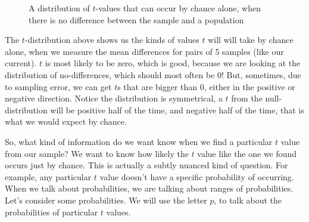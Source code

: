 \documentclass[
  letterpaper,
  DIV=11,
  numbers=noendperiod]{scrreprt}
\begin{document}
\begin{figure}


\caption{\label{fig-7tnull}A distribution of \(t\)-values that can occur
by chance alone, when there is no difference between the sample and a
population}

\end{figure}%

The \(t\)-distribution above shows us the kinds of values \(t\) will
will take by chance alone, when we measure the mean differences for
pairs of 5 samples (like our current). \(t\) is most likely to be zero,
which is good, because we are looking at the distribution of
no-differences, which should most often be 0! But, sometimes, due to
sampling error, we can get \(t\)s that are bigger than 0, either in the
positive or negative direction. Notice the distribution is symmetrical,
a \(t\) from the null-distribution will be positive half of the time,
and negative half of the time, that is what we would expect by chance.

So, what kind of information do we want know when we find a particular
\(t\) value from our sample? We want to know how likely the \(t\) value
like the one we found occurs just by chance. This is actually a subtly
nuanced kind of question. For example, any particular \(t\) value
doesn't have a specific probability of occurring. When we talk about
probabilities, we are talking about ranges of probabilities. Let's
consider some probabilities. We will use the letter \(p\), to talk about
the probabilities of particular \(t\) values.
\end{document}
